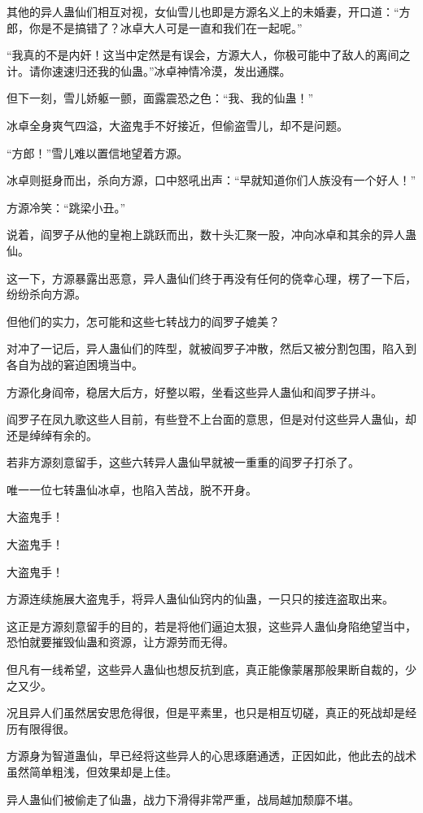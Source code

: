\begin{this_body}
其他的异人蛊仙们相互对视，女仙雪儿也即是方源名义上的未婚妻，开口道：“方郎，你是不是搞错了？冰卓大人可是一直和我们在一起呢。”

“我真的不是内奸！这当中定然是有误会，方源大人，你极可能中了敌人的离间之计。请你速速归还我的仙蛊。”冰卓神情冷漠，发出通牒。

但下一刻，雪儿娇躯一颤，面露震恐之色：“我、我的仙蛊！”

冰卓全身爽气四溢，大盗鬼手不好接近，但偷盗雪儿，却不是问题。

“方郎！”雪儿难以置信地望着方源。

冰卓则挺身而出，杀向方源，口中怒吼出声：“早就知道你们人族没有一个好人！”

方源冷笑：“跳梁小丑。”

说着，阎罗子从他的皇袍上跳跃而出，数十头汇聚一股，冲向冰卓和其余的异人蛊仙。

这一下，方源暴露出恶意，异人蛊仙们终于再没有任何的侥幸心理，楞了一下后，纷纷杀向方源。

但他们的实力，怎可能和这些七转战力的阎罗子媲美？

对冲了一记后，异人蛊仙们的阵型，就被阎罗子冲散，然后又被分割包围，陷入到各自为战的窘迫困境当中。

方源化身阎帝，稳居大后方，好整以暇，坐看这些异人蛊仙和阎罗子拼斗。

阎罗子在凤九歌这些人目前，有些登不上台面的意思，但是对付这些异人蛊仙，却还是绰绰有余的。

若非方源刻意留手，这些六转异人蛊仙早就被一重重的阎罗子打杀了。

唯一一位七转蛊仙冰卓，也陷入苦战，脱不开身。

大盗鬼手！

大盗鬼手！

大盗鬼手！

方源连续施展大盗鬼手，将异人蛊仙仙窍内的仙蛊，一只只的接连盗取出来。

这正是方源刻意留手的目的，若是将他们逼迫太狠，这些异人蛊仙身陷绝望当中，恐怕就要摧毁仙蛊和资源，让方源劳而无得。

但凡有一线希望，这些异人蛊仙也想反抗到底，真正能像蒙屠那般果断自裁的，少之又少。

况且异人们虽然居安思危得很，但是平素里，也只是相互切磋，真正的死战却是经历有限得很。

方源身为智道蛊仙，早已经将这些异人的心思琢磨通透，正因如此，他此去的战术虽然简单粗浅，但效果却是上佳。

异人蛊仙们被偷走了仙蛊，战力下滑得非常严重，战局越加颓靡不堪。


\end{this_body}
